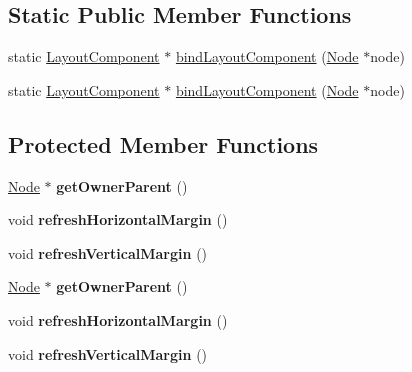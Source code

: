 \subsection*{Static Public Member Functions}
\begin{DoxyCompactItemize}
\item 
static \hyperlink{classui_1_1LayoutComponent}{Layout\+Component} $\ast$ \hyperlink{classui_1_1LayoutComponent_a1438d8e739776d9794da37def67862da}{bind\+Layout\+Component} (\hyperlink{classNode}{Node} $\ast$node)
\item 
static \hyperlink{classui_1_1LayoutComponent}{Layout\+Component} $\ast$ \hyperlink{classui_1_1LayoutComponent_a60fc7a074d1465aa1403dd320265e7fd}{bind\+Layout\+Component} (\hyperlink{classNode}{Node} $\ast$node)
\end{DoxyCompactItemize}
\subsection*{Protected Member Functions}
\begin{DoxyCompactItemize}
\item 
\mbox{\label{classui_1_1LayoutComponent_ae362cbdfe7fee1b6913ddef9c4c54be7}} 
\hyperlink{classNode}{Node} $\ast$ {\bfseries get\+Owner\+Parent} ()
\item 
\mbox{\label{classui_1_1LayoutComponent_aa1bcb3a62282d3c7bce4efef4acf593a}} 
void {\bfseries refresh\+Horizontal\+Margin} ()
\item 
\mbox{\label{classui_1_1LayoutComponent_a99b320bfb1f81ac92769969803a834ce}} 
void {\bfseries refresh\+Vertical\+Margin} ()
\item 
\mbox{\label{classui_1_1LayoutComponent_a357a9b50876198395803f355139bf442}} 
\hyperlink{classNode}{Node} $\ast$ {\bfseries get\+Owner\+Parent} ()
\item 
\mbox{\label{classui_1_1LayoutComponent_aa1bcb3a62282d3c7bce4efef4acf593a}} 
void {\bfseries refresh\+Horizontal\+Margin} ()
\item 
\mbox{\label{classui_1_1LayoutComponent_a99b320bfb1f81ac92769969803a834ce}} 
void {\bfseries refresh\+Vertical\+Margin} ()
\end{DoxyCompactItemize}
